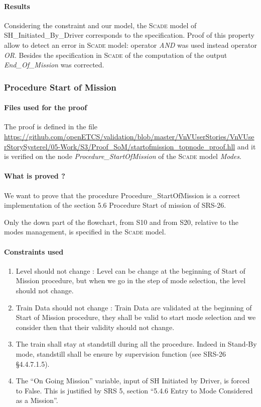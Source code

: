 \documentclass{article}
\newcommand{\SCADE}{\textsc{Scade}}
\begin{document}
\paragraph{Results}
Considering the constraint and our model, the \SCADE{} model of
SH\_Initiated\_By\_Driver corresponds to the specification. Proof of this property allow to detect an error in \SCADE{} model: operator \emph{AND} was used instead operator \emph{OR}.
Besides the specification in \SCADE{}  of the computation of the output \emph{End\_Of\_Mission} was corrected.

\subsubsection{Procedure Start of Mission}

\paragraph{Files used for the proof}
The proof is defined in the file \url{https://github.com/openETCS/validation/blob/master/VnVUserStories/VnVUserStorySysterel/05-Work/S3/Proof_SoM/startofmission_topnode_proof.hll} and it is verified on the node \emph{Procedure\_StartOfMission} of the \SCADE{} model \emph{Modes}.


\paragraph{What is proved ?}
We want to prove that the procedure Procedure\_StartOfMission is a
correct implementation of the section 5.6 Procedure Start of mission of SRS-26.

Only the down part of the flowchart, from S10 and from S20, relative to the modes management, is specified in the \SCADE{} model.





\paragraph{Constraints used}
\begin{enumerate}
\item Level should not change : Level can be change at the beginning of Start of Mission procedure, but when we go in the step of mode selection, the level should not change.

\item Train Data should not change : Train Data are validated at the beginning of Start of Mission procedure, they shall be valid to start mode selection and we consider then that  their validity should not change.

\item The train shall stay at standstill during all the procedure. Indeed in Stand-By mode, standstill shall be ensure by supervision function (see SRS-26 §4.4.7.1.5).

\item The ``On Going Mission'' variable, input of SH Initiated by Driver, is
forced to False. This is justified by SRS 5, section ``5.4.6 Entry to
Mode Considered as a Mission''.
\end{enumerate}
\end{document}
